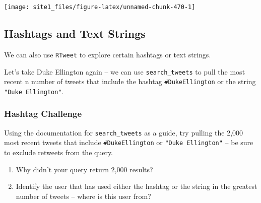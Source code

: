 \documentclass[]{book}
\begin{document}
\begin{center}\texttt{[image: site1\_files/figure-latex/unnamed-chunk-470-1]} \end{center}

\subsection{Hashtags and Text Strings}\label{hashtags-and-text-strings}

We can also use \texttt{RTweet} to explore certain hashtags or text
strings.

Let's take Duke Ellington again -- we can use \texttt{search\_tweets} to
pull the most recent n number of tweets that include the hashtag
\texttt{\#DukeEllington} or the string \texttt{"Duke\ Ellington"}.

\subsubsection*{Hashtag Challenge}\label{hashtag-challenge}

Using the documentation for \texttt{search\_tweets} as a guide, try
pulling the 2,000 most recent tweets that include
\texttt{\#DukeEllington} or \texttt{"Duke\ Ellington"} -- be sure to
exclude retweets from the query.

\begin{enumerate}
\def\labelenumi{\arabic{enumi}.}
\item
  Why didn't your query return 2,000 results?
\item
  Identify the user that has used either the hashtag or the string in
  the greatest number of tweets -- where is this user from?
\end{enumerate}
\end{document}
